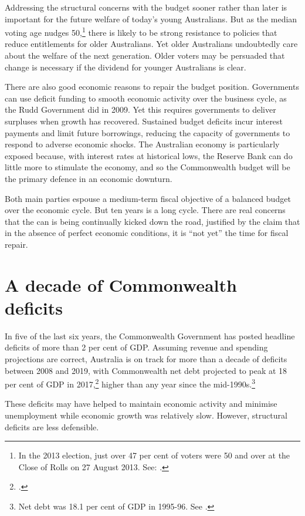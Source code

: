 \documentclass[twoside,english]{grattanBudgetRepairb5portrait}
\begin{document}
Addressing the structural concerns with the budget sooner rather than later is important for the future welfare of today’s young Australians. But as the median voting age nudges 50,\footnote{In the 2013 election, just over 47 per cent of voters were 50 and over at the Close of Rolls on 27 August 2013. See: \textcite{AEC2013}.}  there is likely to be strong resistance to policies that reduce entitlements for older Australians. Yet older Australians undoubtedly care about the welfare of the next generation. Older voters may be persuaded that change is necessary if the dividend for younger Australians is clear. 

There are also good economic reasons to repair the budget position. Governments can use deficit funding to smooth economic activity over the business cycle, as the Rudd Government did in 2009. Yet this requires governments to deliver surpluses when growth has recovered. Sustained budget deficits incur interest payments and limit future borrowings, reducing the capacity of governments to respond to adverse economic shocks. The Australian economy is particularly exposed because, with interest rates at historical lows, the Reserve Bank can do little more to stimulate the economy, and so the Commonwealth budget will be the primary defence in an economic downturn. 

Both main parties espouse a medium-term fiscal objective of a balanced budget over the economic cycle. But ten years is a long cycle. There are real concerns that the can is being continually kicked down the road, justified by the claim that in the absence of perfect economic conditions, it is “not yet” the time for fiscal repair.
\cleardoubleevenstandardpage
\@openrighttrue\makeatother
\chapter{A decade of Commonwealth deficits}\label{chapter:FISCAL-2}
In five of the last six years, the Commonwealth Government has posted headline deficits of more than 2 per cent of GDP\@. Assuming revenue and spending projections are correct, Australia is on track for more than a decade of deficits between 2008 and 2019, with Commonwealth net debt projected to peak at 18 per cent of GDP in 2017,\footcite[][3--9]{Treasury2015BudgetPapers201516}  higher than any year since the mid-1990s.\footnote{Net debt was 18.1 per cent of GDP in 1995-96. See \textcite[][273]{Treasury2014-MYEFO-2014-15}.}

These deficits may have helped to maintain economic activity and minimise unemployment while economic growth was relatively slow. However, structural deficits are less defensible. 
\end{document}
